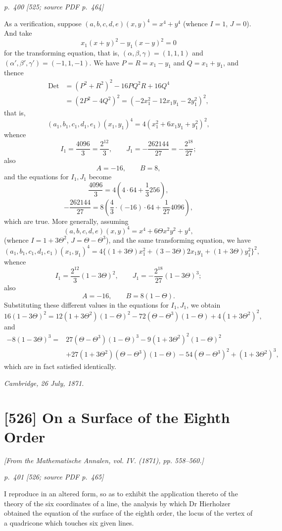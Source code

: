 \documentclass[11pt,a4paper]{article}
\newcommand{\pagemarker}[3]{\par\bigskip\noindent\textit{p.~#1 [#2; source PDF p.~#3]}\par\smallskip}
\newcommand{\Det}{\operatorname{Det}}
\begin{document}
\pagemarker{400}{525}{464}

As a verification, suppose $(a,b,c,d,e)(x,y)^4=x^4+y^4$ (whence $I=1$, $J=0$).
And take
\[
x_1(x+y)^2-y_1(x-y)^2=0
\]
for the transforming equation, that is, $(\alpha,\beta,\gamma)=(1,1,1)$ and
$(\alpha',\beta',\gamma')=(-1,1,-1)$. We have $P=R=x_1-y_1$ and $Q=x_1+y_1$,
and thence
\[
\begin{aligned}
\Det&=(P^2+R^2)^2-16PQ^2R+16Q^4\\
&=(2P^2-4Q^2)^2=(-2x_1^2-12x_1y_1-2y_1^2)^2,
\end{aligned}
\]
that is,
\[
(a_1,b_1,c_1,d_1,e_1)(x_1,y_1)^4=4(x_1^2+6x_1y_1+y_1^2)^2,
\]
whence
\[
I_1=\frac{4096}{3}=\frac{2^{12}}3,\qquad
J_1=-\frac{262144}{27}=-\frac{2^{18}}{27};
\]
also
\[
A=-16,\qquad B=8,
\]
and the equations for $I_1,J_1$ become
\[
\frac{4096}{3}=4\left(4\cdot64+\frac13 256\right),
\]
\[
-\frac{262144}{27}=8\left(\frac43\cdot(-16)\cdot64+\frac1{27}4096\right),
\]
which are true. More generally, assuming
\[
(a,b,c,d,e)(x,y)^4=x^4+6\Theta x^2y^2+y^4,
\]
(whence $I=1+3\Theta^2$, $J=\Theta-\Theta^3$), and the same transforming equation,
we have
\[
(a_1,b_1,c_1,d_1,e_1)(x_1,y_1)^4
=4\{(1+3\Theta)x_1^2+(3-3\Theta)2x_1y_1+(1+3\Theta)y_1^2\}^2,
\]
whence
\[
I_1=\frac{2^{12}}3(1-3\Theta)^2,\qquad
J_1=-\frac{2^{18}}{27}(1-3\Theta)^3;
\]
also
\[
A=-16,\qquad B=8(1-\Theta).
\]
Substituting these different values in the equations for $I_1,J_1$, we obtain
\[
16(1-3\Theta)^2=12(1+3\Theta^2)(1-\Theta)^2
-72(\Theta-\Theta^3)(1-\Theta)+4(1+3\Theta^2)^2,
\]
and
\[
\begin{aligned}
-8(1-3\Theta)^3={}&27(\Theta-\Theta^3)(1-\Theta)^3
-9(1+3\Theta^2)^2(1-\Theta)^2\\
&+27(1+3\Theta^2)(\Theta-\Theta^3)(1-\Theta)
-54(\Theta-\Theta^3)^2+(1+3\Theta^2)^3,
\end{aligned}
\]
which are in fact satisfied identically.

\noindent\textit{Cambridge, 26 July, 1871.}

\clearpage
\section*{[526] On a Surface of the Eighth Order}
\begin{center}
\textit{[From the Mathematische Annalen, vol. IV. (1871), pp. 558--560.]}
\end{center}

\pagemarker{401}{526}{465}

I reproduce in an altered form, so as to exhibit the application thereto of the theory
of the six coordinates of a line, the analysis by which Dr Hierholzer obtained the
equation of the surface of the eighth order, the locus of the vertex of a quadricone
which touches six given lines.
\end{document}
